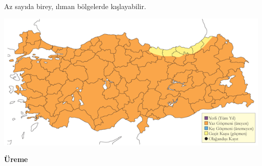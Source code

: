 \documentclass[
  letterpaper,
  DIV=11,
  numbers=noendperiod]{scrreprt}
\begin{document}
Az sayıda birey, ılıman bölgelerde kışlayabilir.

\includegraphics{images/harita_Page_060.png}

\textbf{Üreme}
\end{document}
